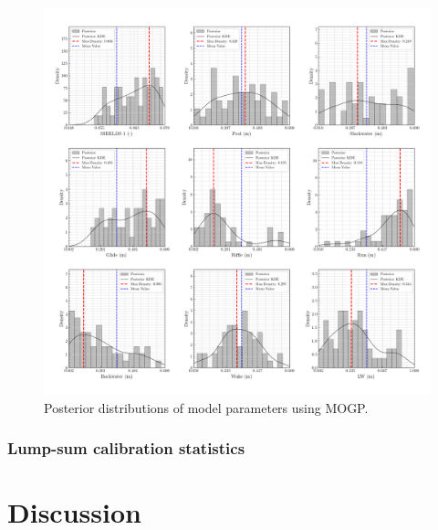 \documentclass[draft,linenumbers,onecolumn]{agujournal2019} %
\begin{document}
\begin{figure}[htbp]
	\centering
	\includegraphics[width=1\textwidth]{images/posterior_distributions_iteration_76-WD-SV.png}
	\caption{Posterior distributions of model parameters using MOGP.}
	\label{fig:posterior_distributions}
\end{figure}

\subsubsection{Lump-sum calibration statistics}




\section{Discussion}





%
%
%
%
%
%
\end{document}
